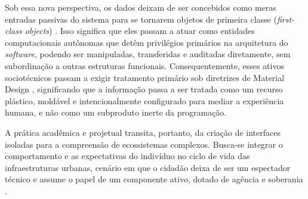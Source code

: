 \documentclass[12pt]{article}
\begin{document}
    Sob essa nova perspectiva, os dados deixam de ser concebidos como meras entradas passivas do sistema para se tornarem objetos de primeira classe (\textit{first-class objects}) \cite{calvetti2024human, Raj2023}. Isso significa que eles passam a atuar como entidades computacionais autônomas que detêm privilégios primários na arquitetura do \textit{software}, podendo ser manipuladas, transferidas e auditadas diretamente, sem subordinação a outras estruturas funcionais. Consequentemente, esses ativos sociotécnicos passam a exigir tratamento primário sob diretrizes de Material Design \cite{seidelin2020foregrounding}, significando que a informação passa a ser tratada como um recurso plástico, moldável e intencionalmente configurado para mediar a experiência humana, e não como um subproduto inerte da programação. 

    A prática acadêmica e projetual transita, portanto, da criação de interfaces isoladas para a compreensão de ecossistemas complexos. Busca-se integrar o comportamento e as expectativas do indivíduo no ciclo de vida das infraestruturas urbanas, cenário em que o cidadão deixa de ser um espectador técnico e assume o papel de um componente ativo, dotado de agência e soberania \cite{sailaja2021exploring, bavaresco2019technological}.

\end{document}
